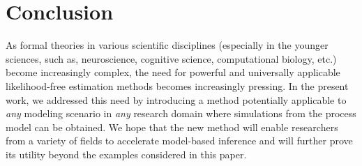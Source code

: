 \documentclass[9pt,twoside,lineno]{pnas-new}
\begin{document}
\section*{Conclusion}

As formal theories in various scientific disciplines (especially in the younger sciences, such as, neuroscience, cognitive science, computational biology, etc.) become increasingly complex, the need for powerful and universally applicable likelihood-free estimation methods becomes increasingly pressing. In the present work, we addressed this need by introducing a method potentially applicable to \textit{any} modeling scenario in \textit{any} research domain where simulations from the process model can be obtained. We hope that the new method will enable researchers from a variety of fields to accelerate model-based inference and will further prove its utility beyond the examples considered in this paper.



\showacknow %


\end{document}
